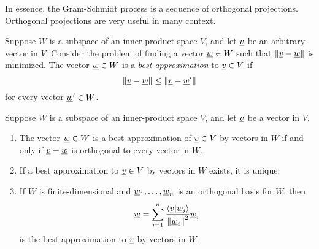 In essence, the Gram-Schmidt process is a sequence of orthogonal projections.
Orthogonal projections are very useful in many context.

Suppose $W$ is a subspace of an inner-product space $V$, and let $\underline{v}$ be an arbitrary vector in $V$.
Consider the problem of finding a vector $\underline{w} \in W$ such that $\left\| \underline{v} - \underline{w} \right\|$ is minimized.
The vector $\underline{w} \in W$ is a \emph{best approximation} to $\underline{v} \in V$ if
\begin{equation*}
\left\| \underline{v} - \underline{w} \right\| \leq \left\| \underline{v} - \underline{w}' \right\|
\end{equation*}
for every vector $\underline{w}' \in W$.

\begin{theorem} \label{theorem:OrthogonalProjection}
Suppose $W$ is a subspace of an inner-product space $V$, and let $\underline{v}$ be a vector in $V$.
\begin{enumerate}
\item The vector $\underline{w} \in W$ is a best approximation of $\underline{v} \in V$ by vectors in $W$ if and only if $\underline{v} - \underline{w}$ is orthogonal to every vector in $W$.
\item If a best approximation to $\underline{v} \in V$ by vectors in $W$ exists, it is unique.
\item If $W$ is finite-dimensional and $\underline{w}_1, \ldots, \underline{w}_n$ is an orthogonal basis for $W$, then
\begin{equation*}
\underline{w} = \sum_{i=1}^n \frac{ \left\langle \underline{v} | \underline{w}_i \right\rangle }{ \left\| \underline{w}_i \right\|^2 } \underline{w}_i
\end{equation*}
is the best approximation to $\underline{v}$ by vectors in $W$.
\end{enumerate}
\end{theorem}
